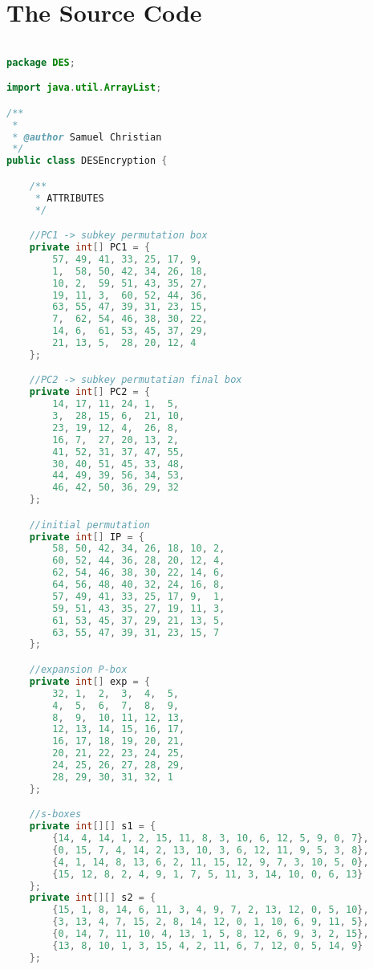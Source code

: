 \chapter{The Source Code}
\label{app:A}

\singlespacing

\begin{lstlisting}[language=Java,basicstyle=\tiny,caption=DESEncryption.java]

package DES;

import java.util.ArrayList;

/**
 *
 * @author Samuel Christian
 */
public class DESEncryption {

    /**
     * ATTRIBUTES
     */

    //PC1 -> subkey permutation box
    private int[] PC1 = {
        57, 49, 41, 33, 25, 17, 9,
        1,  58, 50, 42, 34, 26, 18,
        10, 2,  59, 51, 43, 35, 27,
        19, 11, 3,  60, 52, 44, 36,
        63, 55, 47, 39, 31, 23, 15,
        7,  62, 54, 46, 38, 30, 22,
        14, 6,  61, 53, 45, 37, 29,
        21, 13, 5,  28, 20, 12, 4
    };

    //PC2 -> subkey permutatian final box
    private int[] PC2 = {
        14, 17, 11, 24, 1,  5,
        3,  28, 15, 6,  21, 10,
        23, 19, 12, 4,  26, 8,
        16, 7,  27, 20, 13, 2,
        41, 52, 31, 37, 47, 55,
        30, 40, 51, 45, 33, 48,
        44, 49, 39, 56, 34, 53,
        46, 42, 50, 36, 29, 32
    };

    //initial permutation
    private int[] IP = {
        58, 50, 42, 34, 26, 18, 10, 2,
        60, 52, 44, 36, 28, 20, 12, 4,
        62, 54, 46, 38, 30, 22, 14, 6,
        64, 56, 48, 40, 32, 24, 16, 8,
        57, 49, 41, 33, 25, 17, 9,  1,
        59, 51, 43, 35, 27, 19, 11, 3,
        61, 53, 45, 37, 29, 21, 13, 5,
        63, 55, 47, 39, 31, 23, 15, 7
    };

    //expansion P-box
    private int[] exp = {
        32, 1,  2,  3,  4,  5,
        4,  5,  6,  7,  8,  9,
        8,  9,  10, 11, 12, 13,
        12, 13, 14, 15, 16, 17,
        16, 17, 18, 19, 20, 21,
        20, 21, 22, 23, 24, 25,
        24, 25, 26, 27, 28, 29,
        28, 29, 30, 31, 32, 1
    };

    //s-boxes
    private int[][] s1 = {
        {14, 4, 14, 1, 2, 15, 11, 8, 3, 10, 6, 12, 5, 9, 0, 7},
        {0, 15, 7, 4, 14, 2, 13, 10, 3, 6, 12, 11, 9, 5, 3, 8},
        {4, 1, 14, 8, 13, 6, 2, 11, 15, 12, 9, 7, 3, 10, 5, 0},
        {15, 12, 8, 2, 4, 9, 1, 7, 5, 11, 3, 14, 10, 0, 6, 13}
    };
    private int[][] s2 = {
        {15, 1, 8, 14, 6, 11, 3, 4, 9, 7, 2, 13, 12, 0, 5, 10},
        {3, 13, 4, 7, 15, 2, 8, 14, 12, 0, 1, 10, 6, 9, 11, 5},
        {0, 14, 7, 11, 10, 4, 13, 1, 5, 8, 12, 6, 9, 3, 2, 15},
        {13, 8, 10, 1, 3, 15, 4, 2, 11, 6, 7, 12, 0, 5, 14, 9}
    };


\end{lstlisting}
